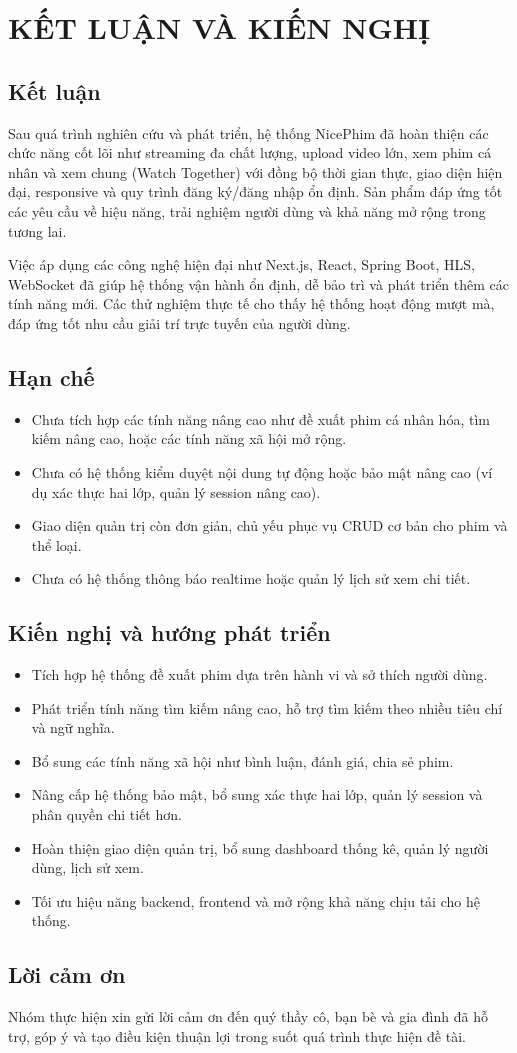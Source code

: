 \newpage

\section{\textbf{KẾT LUẬN VÀ KIẾN NGHỊ}}

\subsection{Kết luận}
Sau quá trình nghiên cứu và phát triển, hệ thống NicePhim đã hoàn thiện các chức năng cốt lõi như streaming đa chất lượng, upload video lớn, xem phim cá nhân và xem chung (Watch Together) với đồng bộ thời gian thực, giao diện hiện đại, responsive và quy trình đăng ký/đăng nhập ổn định. Sản phẩm đáp ứng tốt các yêu cầu về hiệu năng, trải nghiệm người dùng và khả năng mở rộng trong tương lai.

Việc áp dụng các công nghệ hiện đại như Next.js, React, Spring Boot, HLS, WebSocket đã giúp hệ thống vận hành ổn định, dễ bảo trì và phát triển thêm các tính năng mới. Các thử nghiệm thực tế cho thấy hệ thống hoạt động mượt mà, đáp ứng tốt nhu cầu giải trí trực tuyến của người dùng.

\subsection{Hạn chế}
\begin{itemize}
	\item Chưa tích hợp các tính năng nâng cao như đề xuất phim cá nhân hóa, tìm kiếm nâng cao, hoặc các tính năng xã hội mở rộng.
	\item Chưa có hệ thống kiểm duyệt nội dung tự động hoặc bảo mật nâng cao (ví dụ xác thực hai lớp, quản lý session nâng cao).
	\item Giao diện quản trị còn đơn giản, chủ yếu phục vụ CRUD cơ bản cho phim và thể loại.
	\item Chưa có hệ thống thông báo realtime hoặc quản lý lịch sử xem chi tiết.
\end{itemize}

\subsection{Kiến nghị và hướng phát triển}
\begin{itemize}
	\item Tích hợp hệ thống đề xuất phim dựa trên hành vi và sở thích người dùng.
	\item Phát triển tính năng tìm kiếm nâng cao, hỗ trợ tìm kiếm theo nhiều tiêu chí và ngữ nghĩa.
	\item Bổ sung các tính năng xã hội như bình luận, đánh giá, chia sẻ phim.
	\item Nâng cấp hệ thống bảo mật, bổ sung xác thực hai lớp, quản lý session và phân quyền chi tiết hơn.
	\item Hoàn thiện giao diện quản trị, bổ sung dashboard thống kê, quản lý người dùng, lịch sử xem.
	\item Tối ưu hiệu năng backend, frontend và mở rộng khả năng chịu tải cho hệ thống.
\end{itemize}

\subsection{Lời cảm ơn}
Nhóm thực hiện xin gửi lời cảm ơn đến quý thầy cô, bạn bè và gia đình đã hỗ trợ, góp ý và tạo điều kiện thuận lợi trong suốt quá trình thực hiện đề tài.

